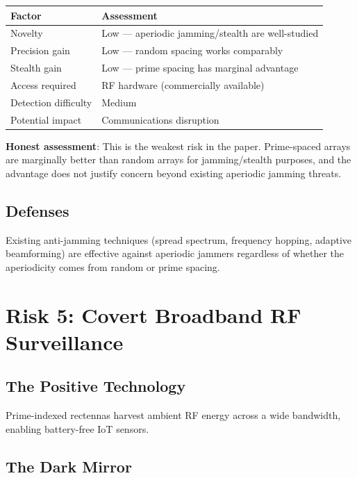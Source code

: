 \documentclass[11pt,a4paper]{article}
\begin{document}
\begin{center}
\begin{tabular}{@{}ll@{}}
\toprule
\textbf{Factor} & \textbf{Assessment} \\
\midrule
Novelty & Low --- aperiodic jamming/stealth are well-studied \\
Precision gain & Low --- random spacing works comparably \\
Stealth gain & Low --- prime spacing has marginal advantage \\
Access required & RF hardware (commercially available) \\
Detection difficulty & Medium \\
Potential impact & Communications disruption \\
\bottomrule
\end{tabular}
\end{center}

\textbf{Honest assessment}: This is the weakest risk in the paper.
Prime-spaced arrays are marginally better than random arrays for
jamming/stealth purposes, and the advantage does not justify
concern beyond existing aperiodic jamming threats.

\subsection{Defenses}

Existing anti-jamming techniques (spread spectrum, frequency
hopping, adaptive beamforming) are effective against aperiodic
jammers regardless of whether the aperiodicity comes from random
or prime spacing.

\section{Risk 5: Covert Broadband RF Surveillance}
\label{sec:surveillance}

\subsection{The Positive Technology}

Prime-indexed rectennas harvest ambient RF energy across a wide
bandwidth, enabling battery-free IoT sensors.

\subsection{The Dark Mirror}
\end{document}
